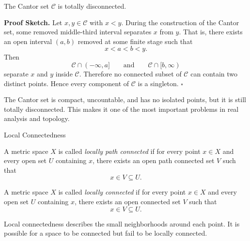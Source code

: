 \documentclass[12pt, a4paper]{article}
\begin{document}
\clearpage

\begin{theorem}
The Cantor set $\mathcal{C}$ is totally disconnected.
\end{theorem}

\textbf{Proof Sketch.}
Let $x,y\in\mathcal{C}$ with $x<y$. During the construction of the Cantor set, some removed middle-third interval separates $x$ from $y$. That is, there exists an open interval $(a,b)$ removed at some finite stage such that
\[
    x<a<b<y.
\]
Then
\[
    \mathcal{C}\cap(-\infty,a]
    \qquad\text{and}\qquad
    \mathcal{C}\cap[b,\infty)
\]
separate $x$ and $y$ inside $\mathcal{C}$. Therefore no connected subset of $\mathcal{C}$ can contain two distinct points. Hence every component of $\mathcal{C}$ is a singleton. \hfill $\square$

\vfill

\begin{problem}[Remark]
The Cantor set is compact, uncountable, and has no isolated points, but it is still totally disconnected. This makes it one of the most important problems in real analysis and topology.
\end{problem}

\clearpage

\begin{heading}
    Local Connectedness
\end{heading}

\vspace{10pt}

\begin{definition}
A metric space $X$ is called \textit{locally path connected} if for every point $x\in X$ and every open set $U$ containing $x$, there exists an open path connected set $V$ such that
\[
    x\in V\subseteq U.
\]
\end{definition}

\vspace{200pt}

\begin{definition}
A metric space $X$ is called \textit{locally connected} if for every point $x\in X$ and every open set $U$ containing $x$, there exists an open connected set $V$ such that
\[
    x\in V\subseteq U.
\]
\end{definition}

\clearpage

\begin{problem}
Local connectedness describes the small neighborhoods around each point. It is possible for a space to be connected but fail to be locally connected.
\end{problem}
\end{document}

